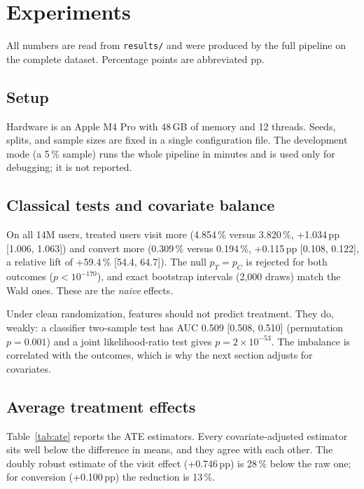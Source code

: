 \section{Experiments}
\label{sec:experiments}

All numbers are read from \texttt{results/} and were produced by the full
pipeline on the complete dataset. Percentage points are abbreviated pp.

\subsection{Setup}
\label{sec:setup}

Hardware is an Apple M4 Pro with 48\,GB of memory and 12 threads. Seeds,
splits, and sample sizes are fixed in a single configuration file. The
development mode (a 5\,\% sample) runs the whole pipeline in minutes and is
used only for debugging; it is not reported.

\subsection{Classical tests and covariate balance}
\label{sec:classical}

On all 14M users, treated users visit more (4.854\,\% versus 3.820\,\%,
+1.034\,pp [1.006, 1.063]) and convert more (0.309\,\% versus 0.194\,\%,
+0.115\,pp [0.108, 0.122], a relative lift of +59.4\,\% [54.4, 64.7]). The
null $p_T=p_C$ is rejected for both outcomes ($p<10^{-170}$), and exact
bootstrap intervals (2,000 draws) match the Wald ones. These are the
\emph{naive} effects.

Under clean randomization, features should not predict treatment. They do,
weakly: a classifier two-sample test has AUC 0.509 [0.508, 0.510] (permutation
$p=0.001$) and a joint likelihood-ratio test gives $p=2\times10^{-53}$. The
imbalance is correlated with the outcomes, which is why the next section
adjusts for covariates.

\subsection{Average treatment effects}
\label{sec:ate}

Table~\ref{tab:ate} reports the ATE estimators. Every covariate-adjusted
estimator sits well below the difference in means, and they agree with each
other. The doubly robust estimate of the visit effect (+0.746\,pp) is 28\,\%
below the raw one; for conversion (+0.100\,pp) the reduction is 13\,\%.

